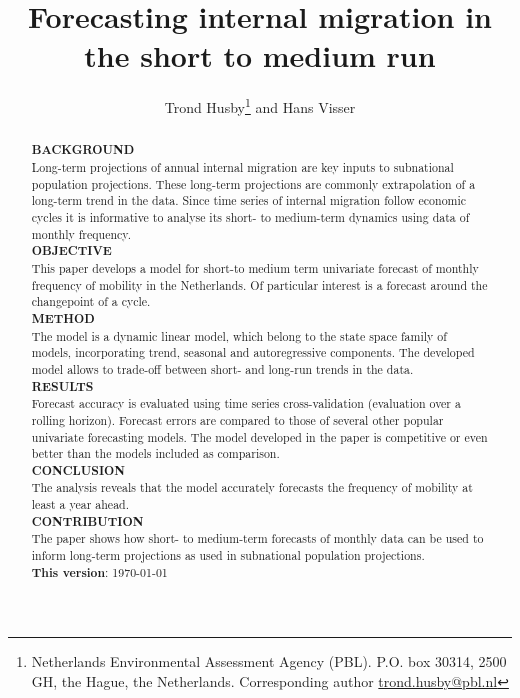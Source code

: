 \documentclass[12pt, a4paper]{article}
\begin{document}
\title{Forecasting internal migration in the short to medium run}

\author{Trond Husby\thanks{Netherlands Environmental Assessment Agency (PBL). P.O. box 30314, 2500 GH, the Hague, the Netherlands. Corresponding author \url{trond.husby@pbl.nl}} and Hans Visser\footnotemark[1]}
\date{}
\maketitle

\newpage

\begin{abstract}
  \noindent
  \textbf{BACKGROUND} \\
  Long-term projections of annual internal migration are key inputs to subnational population projections. These long-term projections are commonly extrapolation of a long-term trend in the data. Since time series of internal migration follow economic cycles it is informative to analyse its short- to medium-term dynamics using data of monthly frequency. \\
\textbf{OBJECTIVE} \\
This paper develops a model for short-to medium term univariate forecast of
monthly frequency of mobility in the Netherlands. Of particular interest is a forecast around the changepoint of a cycle. \\
\textbf{METHOD} \\
The model is a dynamic linear model, which belong to the state space family of models, incorporating trend, seasonal and autoregressive components. The developed model allows to trade-off between short- and long-run trends in the data. \\
\textbf{RESULTS} \\
Forecast accuracy is evaluated using time series cross-validation (evaluation over a rolling horizon). Forecast errors are compared to those of several other popular univariate forecasting models. The model developed in the paper is competitive or even better than the models included as comparison. \\
\textbf{CONCLUSION} \\
The analysis reveals that the model accurately forecasts the frequency of mobility at least a year ahead. \\
\textbf{CONTRIBUTION}\\
The paper shows how short- to medium-term forecasts of monthly data can be used to inform long-term projections as used in subnational population projections. \\ 
\bigskip
\textbf{This version}: {\today}

\end{abstract}
\end{document}
